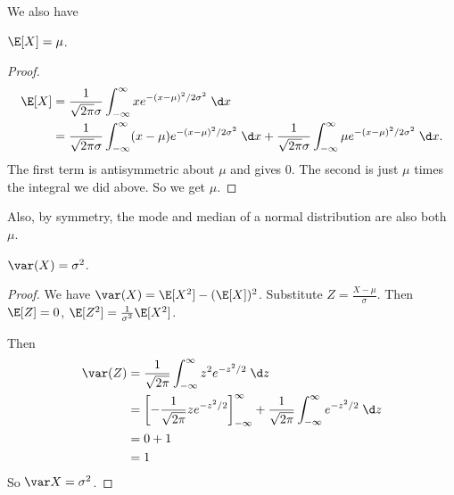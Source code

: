 \documentclass[a4paper]{article}
\begin{document}
We also have
\begin{prop}
  $\E[X] = \mu$.
\end{prop}
\begin{proof}
\begin{align*}
  \E[X] &= \frac{1}{\sqrt{2\pi}\sigma} \int_{-\infty}^\infty x e^{-(x - \mu)^2/2\sigma^2}\;\d x\\
  &= \frac{1}{\sqrt{2\pi} \sigma}\int_{-\infty}^\infty (x - \mu)e^{-(x - \mu)^2/2\sigma^2}\;\d x + \frac{1}{\sqrt{2\pi}\sigma}\int_{-\infty}^\infty \mu e^{-(x - \mu)^2/2\sigma^2}\;\d x.
\end{align*}
The first term is antisymmetric about $\mu$ and gives $0$. The second is just $\mu$ times the integral we did above. So we get $\mu$.
\end{proof}
Also, by symmetry, the mode and median of a normal distribution are also both $\mu$.

\begin{prop}
  $\var(X) = \sigma^2$.
\end{prop}

\begin{proof}
  We have $\var (X) = \E[X^2] - (\E[X])^2$. Substitute $Z = \frac{X - \mu}{\sigma}$. Then $\E[Z] = 0$, $\E[Z^2] = \frac{1}{\sigma^2}\E[X^2]$.

  Then
  \begin{align*}
    \var(Z) &= \frac{1}{\sqrt{2\pi}} \int_{-\infty}^\infty z^2 e^{-z^2/2}\;\d z\\
    &= \left[-\frac{1}{\sqrt{2\pi}}ze^{-z^2/2}\right]_{-\infty}^\infty + \frac{1}{\sqrt{2\pi}}\int_{-\infty}^\infty e^{-z^2/2}\;\d z\\
    &= 0 + 1\\
    &= 1
  \end{align*}
  So $\var X = \sigma^2$.
\end{proof}
\end{document}

